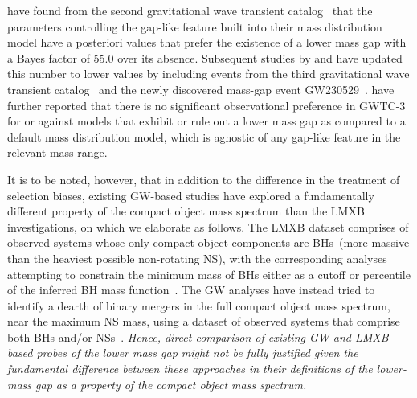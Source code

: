 \documentclass[modern]{aastex631}
\begin{document}
\cite{Farah:2021qom} have found from the second gravitational wave transient catalog~\citep{LIGOScientific:2020ibl} that the parameters controlling the gap-like feature built into their mass distribution model have a posteriori values that prefer the existence of a lower mass gap with a Bayes factor of 55.0 over its absence. Subsequent studies by \cite{KAGRA:2021duu} and \cite{LIGOScientific:2024elc} have updated this number to lower values by including events from the third gravitational wave transient catalog~\citep[GWTC-3,][]{KAGRA:2021vkt} and the newly discovered mass-gap event GW230529~\cite[a compact binary merger whose most massive component lies in the $3-5M_{\odot}$ mass range,][]{LIGOScientific:2024elc}. \cite{KAGRA:2021duu} have further reported that there is no significant observational preference in GWTC-3 for or against models that exhibit or rule out a lower mass gap as compared to a default mass distribution model, which is agnostic of any gap-like feature in the relevant mass range.


It is to be noted, however, that in addition to the difference in the treatment of selection biases, existing GW-based studies have explored a fundamentally different property of the compact object mass spectrum than the LMXB investigations, on which we elaborate as follows. The LMXB dataset comprises of observed systems whose only compact object components are BHs~(more massive than the heaviest possible non-rotating NS), with the corresponding analyses attempting to constrain the minimum mass of BHs either as a cutoff or percentile of the inferred BH mass function~\citep{Bailyn:1997xt, Ozel:2010su, Farr:2010tu}. The GW analyses have instead tried to identify a dearth of binary mergers in the full compact object mass spectrum, near the maximum NS mass, using a dataset of observed systems that comprise both BHs and/or NSs~\citep[i.e. including BNS systems,][]{Farah:2021qom, KAGRA:2021duu}. \textit{Hence, direct comparison of existing GW and LMXB-based probes of the lower mass gap might not be fully justified given the fundamental difference between these approaches in their definitions of the lower-mass gap as a property of the compact object mass spectrum.} %
\end{document}
